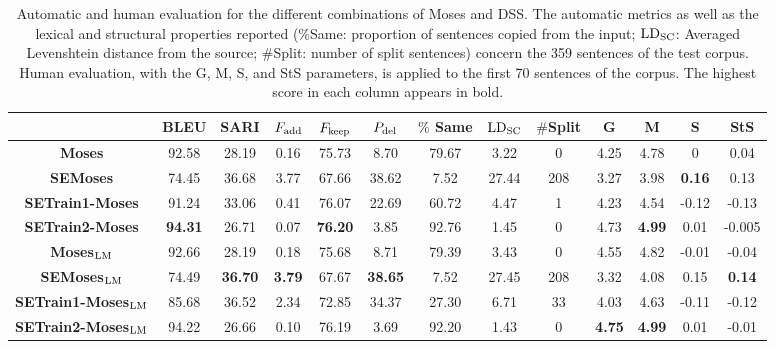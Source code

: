 \documentclass[11pt,a4paper]{article}
\begin{document}
\begin{center}
\begin{table*}[ht]
\scriptsize
\centering
\begin{tabular}{|c|c|c|c|c|c||c|c|c||c|c|c|c|}
\hline
& {\bf BLEU} & {\bf SARI} & {\bf $F_{\rm add}$} & {\bf $F_{\rm keep}$} & {\bf $P_{\rm del}$} & {\bf $\%$ Same} & ${\rm LD_{SC}}$ & $\#$Split &{\bf G} & {\bf M} & {\bf S} & {\bf StS} \\
\hline
{\bf Moses} &92.58 &28.19 & 0.16 & 75.73 & 8.70 & 79.67 & 3.22& 0&4.25 & 4.78 & 0 & 0.04 \\
\hline      
{\bf SEMoses} &74.45  &36.68 & 3.77 & 67.66 & 38.62 & 7.52 & 27.44&208 &3.27 & 3.98 & {\bf 0.16} & 0.13 \\
\hline
{\bf SETrain1-Moses} &91.24 &33.06 & 0.41 & 76.07 & 22.69 &60.72 &4.47& 1& 4.23& 4.54& -0.12& -0.13 \\
\hline     
{\bf SETrain2-Moses} & {\bf 94.31} &26.71 & 0.07 &  {\bf 76.20}&3.85 &92.76&1.45& 0&4.73 & {\bf 4.99} & 0.01 & -0.005 \\
\hline
{\bf Moses$_{{\rm LM}}$} &92.66 &28.19 & 0.18 & 75.68 & 8.71 & 79.39 & 3.43& 0 & 4.55 &  4.82 & -0.01 & -0.04 \\
\hline
{\bf SEMoses$_{{\rm LM}}$} &74.49 &  {\bf 36.70} &  {\bf 3.79} & 67.67 &  {\bf 38.65}& 7.52 &27.45& 208 & 3.32 & 4.08  & 0.15 &  {\bf 0.14}\\
\hline
{\bf SETrain1-Moses$_{{\rm LM}}$} &85.68 &36.52 & 2.34 & 72.85 & 34.37 & 27.30 &6.71& 33& 4.03 & 4.63 & -0.11 & -0.12 \\
\hline
{\bf SETrain2-Moses$_{{\rm LM}}$} &94.22 &26.66 & 0.10 & 76.19 & 3.69& 92.20 &1.43& 0&  {\bf 4.75} & {\bf 4.99} & 0.01 & -0.01\\
\hline
\end{tabular}
\vspace{-0.1cm}
\hfill
\caption{Automatic and human evaluation for the different combinations of Moses and DSS. The automatic metrics as well as the lexical and structural properties reported ($\%$Same: proportion of sentences copied from the input; ${\rm LD_{SC}}$: Averaged Levenshtein distance from the source; $\#$Split: number of split sentences) concern the 359 sentences of the test corpus. Human evaluation, with the G, M, S, and StS parameters, is applied to the first 70 sentences of the corpus.
The highest score in each column appears in bold.
}

\label{moses-based}
\end{table*}
\end{center}
\end{document}

